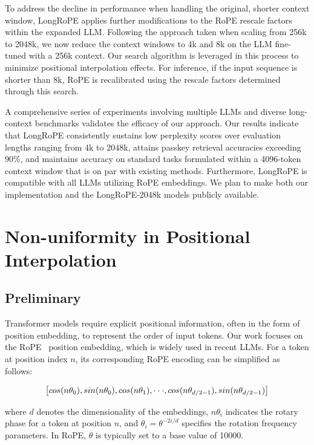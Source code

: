 To address the decline in performance when handling the original, shorter context window, {LongRoPE} applies further modifications to the RoPE rescale factors within the expanded LLM. Following the approach taken when scaling from 256k to 2048k, we now reduce the context windows to 4k and 8k on the LLM fine-tuned with a 256k context. Our search algorithm is leveraged in this process to minimize positional interpolation effects. For inference, if the input sequence is shorter than 8k, RoPE is recalibrated using the rescale factors determined through this search.

A comprehensive series of experiments involving multiple LLMs and diverse long-context benchmarks validates the efficacy of our approach. Our results indicate that LongRoPE consistently sustains low perplexity scores over evaluation lengths ranging from 4k to 2048k, attains passkey retrieval accuracies exceeding 90\%, and maintains accuracy on standard tasks formulated within a 4096-token context window that is on par with existing methods. Furthermore, LongRoPE is compatible with all LLMs utilizing RoPE embeddings. We plan to make both our implementation and the LongRoPE-2048k models publicly available.

\section{Non-uniformity in Positional Interpolation}
\label{sec:analysis}

\subsection{Preliminary}

Transformer models require explicit positional information, often in the form of position embedding, to represent the order of input tokens. Our work focuses on the RoPE~\cite{rope} position embedding, which is widely used in recent  LLMs. For a token at position index $n$, its corresponding RoPE encoding can be simplified as follows:

\begin{equation}
		\fontsize{7.8}{7.8} \selectfont
	\label{eq:rope}
	\left[ cos(n\theta_0), sin(n\theta_0), cos(n\theta_1), \cdot\cdot\cdot, cos(n\theta_{d/2-1}), sin(n\theta_{d/2-1}) \right]   
\end{equation}

where $d$ denotes the dimensionality of the embeddings, $n\theta_i$ indicates the rotary phase for a token at position $n$, and $\theta_i=\theta^{-2i/d}$ specifies the rotation frequency parameters. In RoPE, $\theta$ is typically set to a base value of 10000.

